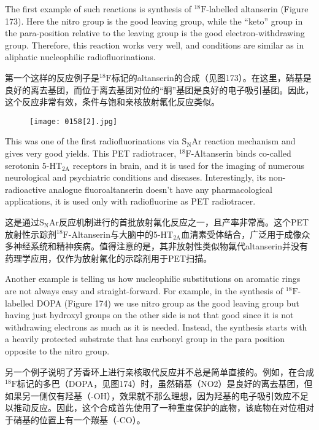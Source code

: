\documentclass[dvipsnames, svgnames,a4paper,11pt]{article}
\begin{document}
The first example of such reactions is synthesis of ${}^\mathrm{18}\mathrm{F}$-labelled altanserin (Figure
173). Here the nitro group is the good leaving group, while the “keto” group in the
para-position relative to the leaving group is the good electron-withdrawing group.
Therefore, this reaction works very well, and conditions are similar as in aliphatic
nucleophilic radiofluorinations.

第一个这样的反应例子是${}^\mathrm{18}\mathrm{F}$标记的altanserin的合成（见图173）。在这里，硝基是良好的离去基团，而位于离去基团对位的“酮”基团是良好的电子吸引基团。因此，这个反应非常有效，条件与饱和亲核放射氟化反应类似。

\begin{figure}[h]
	\centering
    \texttt{[image: 0158[2].jpg]}    
     \label{fig173}
\end{figure}

This was one of the first radiofluorinations via $\mathrm{S_NAr}$ reaction mechanism and gives
very good yields. This PET radiotracer, ${}^\mathrm{18}\mathrm{F}$-Altanserin binds co-called serotonin 5-HT${}_\mathrm{2A}$ receptors in brain, and it is used for the imaging of numerous neurological and
psychiatric conditions and diseases. Interestingly, its non-radioactive analogue
fluoroaltanserin doesn’t have any pharmacological applications, it is used only with
radiofluorine as PET radiotracer.

这是通过$\mathrm{S_NAr}$反应机制进行的首批放射氟化反应之一，且产率非常高。这个PET放射性示踪剂${}^\mathrm{18}\mathrm{F}$-Altanserin与大脑中的5-HT${}_\mathrm{2A}$血清素受体结合，广泛用于成像众多神经系统和精神疾病。值得注意的是，其非放射性类似物氟代altanserin并没有药理学应用，仅作为放射氟化的示踪剂用于PET扫描。

Another example is telling us how nucleophilic substitutions on aromatic rings are not
always easy and straight-forward. For example, in the synthesis of ${}^\mathrm{18}\mathrm{F}$-labelled
DOPA (Figure 174) we use nitro group as the good leaving group but having just
hydroxyl groups on the other side is not that good since it is not withdrawing
electrons as much as it is needed. Instead, the synthesis starts with a heavily
protected substrate that has carbonyl group in the para position opposite to the nitro
group.

另一个例子说明了芳香环上进行亲核取代反应并不总是简单直接的。例如，在合成${}^\mathrm{18}\mathrm{F}$标记的多巴（DOPA，见图174）时，虽然硝基（NO2）是良好的离去基团，但如果另一侧仅有羟基（-OH），效果就不那么理想，因为羟基的电子吸引效应不足以推动反应。因此，这个合成首先使用了一种重度保护的底物，该底物在对位相对于硝基的位置上有一个羰基（-CO）。
\end{document}
